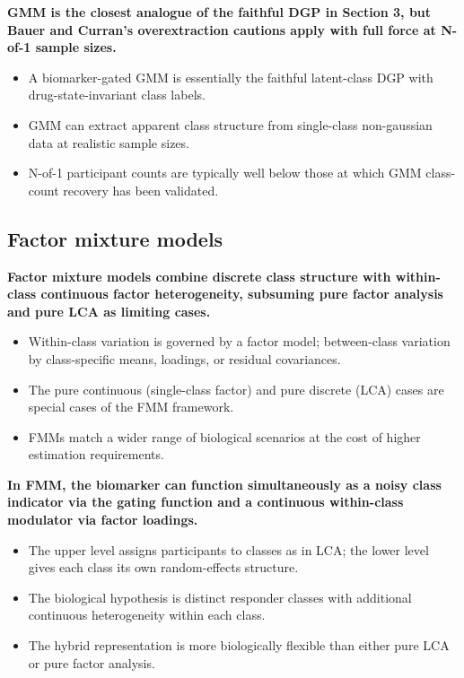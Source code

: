 \documentclass[
  11pt,
]{article}
\begin{document}
\textbf{GMM is the closest analogue of the faithful DGP in Section 3,
but Bauer and Curran's overextraction cautions apply with full force
at N-of-1 sample sizes.}

\begin{itemize}\setlength{\itemsep}{2pt}\setlength{\parskip}{0pt}
\item A biomarker-gated GMM is essentially the faithful latent-class
  DGP with drug-state-invariant class labels.
\item GMM can extract apparent class structure from single-class
  non-gaussian data at realistic sample sizes.
\item N-of-1 participant counts are typically well below those at
  which GMM class-count recovery has been validated.
\end{itemize}

\subsection{Factor mixture models}\label{factor-mixture-models}

\textbf{Factor mixture models combine discrete class structure with
within-class continuous factor heterogeneity, subsuming pure factor
analysis and pure LCA as limiting cases.}

\begin{itemize}\setlength{\itemsep}{2pt}\setlength{\parskip}{0pt}
\item Within-class variation is governed by a factor model;
  between-class variation by class-specific means, loadings, or
  residual covariances.
\item The pure continuous (single-class factor) and pure discrete
  (LCA) cases are special cases of the FMM framework.
\item FMMs match a wider range of biological scenarios at the cost
  of higher estimation requirements.
\end{itemize}

\textbf{In FMM, the biomarker can function simultaneously as a noisy
class indicator via the gating function and a continuous within-class
modulator via factor loadings.}

\begin{itemize}\setlength{\itemsep}{2pt}\setlength{\parskip}{0pt}
\item The upper level assigns participants to classes as in LCA; the
  lower level gives each class its own random-effects structure.
\item The biological hypothesis is distinct responder classes with
  additional continuous heterogeneity within each class.
\item The hybrid representation is more biologically flexible than
  either pure LCA or pure factor analysis.
\end{itemize}
\end{document}
